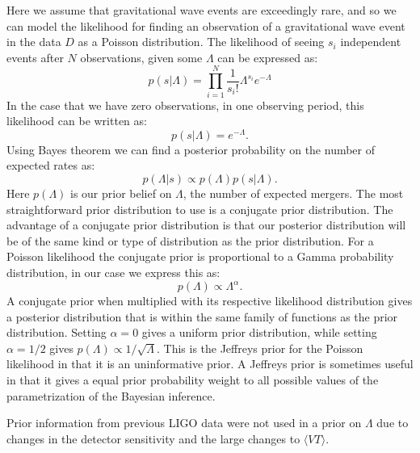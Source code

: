 Here we assume that gravitational wave events are exceedingly rare, and so we can model the likelihood for finding an observation of a gravitational wave event in the data $D$ as a Poisson distribution. The likelihood of seeing $s_i$ independent events after $N$ observations, given some $\Lambda$ can be expressed as:
\begin{equation}\label{eqn:poisson_likelihood}
    p\left(s|\Lambda\right) = \prod_{i=1}^N \frac{1}{s_i!}\Lambda^{s_i} e^{-\Lambda}
\end{equation}
In the case that we have zero observations, in one observing period, this likelihood can be written as:
\begin{equation}\label{eqn:no_event_poiss_like}
    p\left(s|\Lambda\right) = e^{-\Lambda}.
\end{equation}
Using Bayes theorem we can find a posterior probability on the number of expected rates as:
\begin{equation}\label{eqn:posterior_lambda_simple}
    p\left(\Lambda|s\right) \propto p\left(\Lambda\right) p\left(s|\Lambda\right).
\end{equation}
Here $p\left(\Lambda\right)$ is our prior belief on $\Lambda$, the number of expected mergers. The most straightforward prior distribution to use is a conjugate prior distribution. The advantage of a conjugate prior distribution is that our posterior distribution will be of the same kind or type of distribution as the prior distribution. For a Poisson likelihood the conjugate prior is proportional to a Gamma probability distribution, in our case we express this as:
\begin{equation}\label{eqn:prior_lambda_simple}
    p\left(\Lambda\right) \propto \Lambda^{\alpha}.
\end{equation}
A conjugate prior when multiplied with its respective likelihood distribution gives a posterior distribution that is within the same family of functions as the prior distribution. Setting $\alpha=0$ gives a uniform prior distribution, while setting $\alpha = 1/2$ gives $p\left(\Lambda\right) \propto 1/\sqrt{\Lambda}$. This is the Jeffreys prior for the Poisson likelihood in that it is an uninformative prior. A Jeffreys prior is sometimes useful in that it gives a equal prior probability weight to all possible values of the parametrization of the Bayesian inference.

Prior information from previous LIGO data were not used in a prior on $\Lambda$ due to changes in the detector sensitivity and the large changes to $\langle VT\rangle$.


